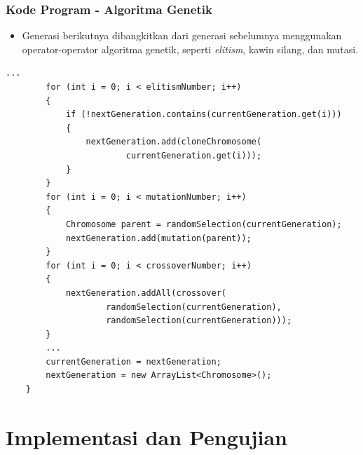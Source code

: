 \documentclass{beamer}
\begin{document}
\begin{frame}[fragile]
\frametitle{Kode Program - Algoritma Genetik}
\begin{itemize}
\item Generasi berikutnya dibangkitkan dari generasi sebelumnya menggunakan operator-operator algoritma genetik, seperti \textit{elitism}, kawin silang, dan mutasi.
\end{itemize}
\begin{lstlisting}[basicstyle=\tiny]
	...
        for (int i = 0; i < elitismNumber; i++)
        {
            if (!nextGeneration.contains(currentGeneration.get(i)))
            {
                nextGeneration.add(cloneChromosome(
                        currentGeneration.get(i)));
            }
        }
        for (int i = 0; i < mutationNumber; i++)
        {
            Chromosome parent = randomSelection(currentGeneration);
            nextGeneration.add(mutation(parent));
        }
        for (int i = 0; i < crossoverNumber; i++)
        {
            nextGeneration.addAll(crossover(
                    randomSelection(currentGeneration),
                    randomSelection(currentGeneration)));
        }
        ...
        currentGeneration = nextGeneration;
        nextGeneration = new ArrayList<Chromosome>();
    }
\end{lstlisting}
\end{frame}


\section{Implementasi dan Pengujian}
\end{document}

